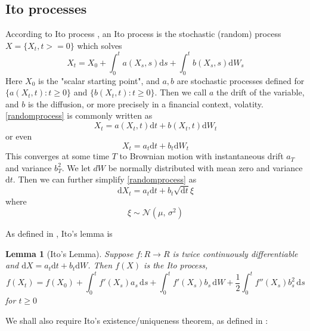 \documentclass[11pt]{article} %
\newtheorem{lemma}[theorem]{Lemma}
\begin{document}
\subsection{Ito processes}

According to Ito process \cite{itoprocess}, an Ito process is the stochastic (random) 
process $X = \{X_t, t>=0\}$ which solves 
\begin{equation} \label{randomprocess}
X_t = X_0 + \int_{0}^{t} a(X_s, s)\mathrm{d}s + 
\int_{0}^{t} b(X_s, s) \mathrm{d}W_s
\end{equation}
Here $X_0$ is the "scalar starting point", and $a,b$ are stochastic 
processes defined for $\{a(X_t, t) : t\geq0\} $ and $\{b(X_t, t) : t\geq0\}$. 
Then we call $a$ the drift of the variable, and $b$ is the diffusion, 
or more precisely in a financial context, volatity. \ref{randomprocess} is commonly 
written as 
\begin{equation}
    X_t = a(X_t, t)\mathrm{d}t + b(X_t, t)\mathrm{d}W_t
\end{equation}
or even 
\begin{equation}
    X_t = a_t\mathrm{d}t + b_t\mathrm{d}W_t
\end{equation}
This converges at some time $T$ to Brownian motion with instantaneous drift $a_T$ and
variance $b_T^2$. We let $dW$ be normally distributed with mean zero and variance 
$\mathrm{d}t$. Then we can further simplify \ref{randomprocess} as 
\begin{equation}
    \mathrm{d}X_t = a_t\mathrm{d}t + b_t \sqrt{\mathrm{d}t}\xi
\end{equation}
where
\begin{equation}
    \xi \sim \mathcal{N}(\mu,\,\sigma^{2})
\end{equation}

As defined in \cite{itoprocess}, Ito's lemma is 

\begin{lemma}[Ito's Lemma]
    Suppose $f: R \to R$ is twice continuously differentiable and 
    $\mathrm{d}X = a_t\mathrm{d}t + b_t\mathrm{d}W$. Then $f(X)$ is the Ito process,
    \begin{equation}
        f(X_t)
        = f(X_0) + \int_0^t \! f'(X_s)a_s \, \mathrm{d}s + 
        \int_0^t \! f'(X_s)b_s \, \mathrm{d}W + \frac{1}{2}\int_0^t \! f''(X_s)b_s^2 \,
         \mathrm{d}s
    \end{equation}
    for $t\ge0$
\end{lemma}
We shall also require Ito's existence/uniqueness theorem, as defined in 
\cite{SDE}:
\end{document}
